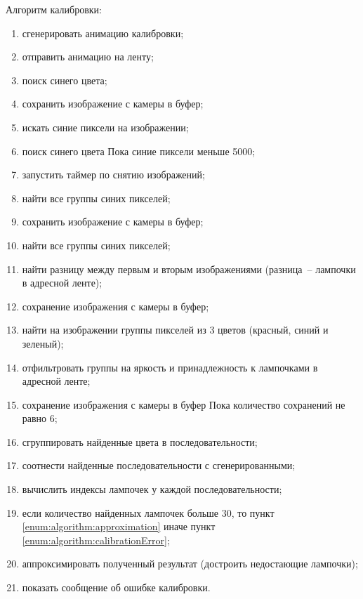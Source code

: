 Алгоритм калибровки:
\begin{enumerate}[label=\arabic*]
	\item сгенерировать анимацию калибровки;
	\item отправить анимацию на ленту;
	\item поиск синего цвета;
	\item сохранить изображение с камеры в буфер;
	\item искать синие пиксели на изображении;
	\item поиск синего цвета Пока синие пиксели меньше 5000;
	\item запустить таймер по снятию изображений;
	\item найти все группы синих пикселей;
	\item сохранить изображение с камеры в буфер;
	\item найти все группы синих пикселей;
	\item найти разницу между первым и вторым изображениями (разница~-- лампочки в адресной ленте);
	\item сохранение изображения с камеры в буфер;
	\item найти на изображении группы пикселей из 3 цветов (красный, синий и зеленый);
	\item отфильтровать группы на яркость и принадлежность к лампочками в адресной ленте;
	\item сохранение изображения с камеры в буфер Пока количество сохранений не равно 6;
	\item сгруппировать найденные цвета в последовательности;
	\item соотнести найденные последовательности с сгенерированными;
	\item вычислить индексы лампочек у каждой последовательности;
	\item если количество найденных лампочек больше 30, то пункт \ref{enum:algorithm:approximation} иначе пункт \ref{enum:algorithm:calibrationError};
	\item \label{enum:algorithm:approximation} аппроксимировать полученный результат (достроить недостающие лампочки);
	\item \label{enum:algorithm:calibrationError} показать сообщение об ошибке калибровки.
\end{enumerate}

